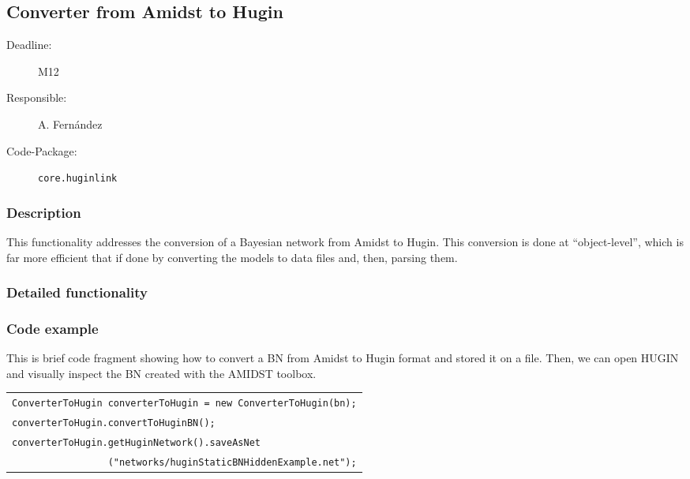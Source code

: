 \newpage
\subsection{Converter from Amidst to Hugin}
\label{ConverterFromAmidstToHugin}

\begin{description}
\item[Deadline:] M12
\item[Responsible:] A. Fern\'andez
\item[Code-Package:] \texttt{core.huginlink}
\end{description}
\subsubsection*{Description}

This functionality addresses the conversion of a Bayesian network from Amidst to Hugin. This conversion is done at ``object-level'', which is far more efficient that if done by converting the models to data files and, then, parsing them. 

\subsubsection*{Detailed functionality}

\vspace{1in}

\subsubsection*{Code example}

This is brief code fragment showing how to convert a BN from Amidst to Hugin format and stored it on a file. Then, we can open HUGIN and visually inspect the BN created with the AMIDST toolbox. 

\begin{table}[H]
\begin{tabular}{l} \hline

        \texttt{ConverterToHugin converterToHugin = new ConverterToHugin(bn);}\\    
        \texttt{converterToHugin.convertToHuginBN();}\\
        \texttt{converterToHugin.getHuginNetwork().saveAsNet}\\ 
        \texttt{~~~~~~~~~~~~~~~~~("networks/huginStaticBNHiddenExample.net");}\\ \hline 

\end{tabular}
\end{table} 